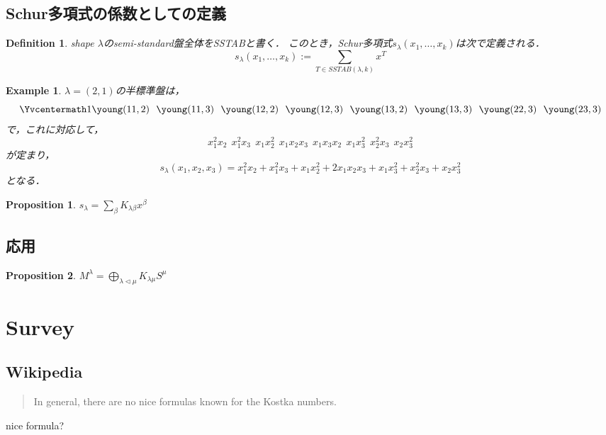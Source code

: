 \documentclass{ujarticle}[12pt,a4pepar]
\theoremstyle{jplain}
\newtheorem*{dfn*}{Definition}
\newtheorem*{prop*}{Proposition}
\newtheorem*{ex*}{Example}
\begin{document}
\subsection{Schur多項式の係数としての定義}
  \begin{dfn*}
    shape $\lambda$のsemi-standard盤全体をSSTABと書く．
    このとき，Schur多項式$s_{\lambda}(x_1, \dots, x_k)$は次で定義される．
    \[
      s_{\lambda}(x_1, \dots, x_k) := \sum_{T \in SSTAB(\lambda, k)} x^T
    \]
  \end{dfn*}
  \begin{ex*}
    $\lambda = (2,1)$の半標準盤は，
    \[
      \Yvcentermath1
      \young({11},{2})\ \ \young({11},{3})\ \ \young({12},{2})\ \ \young({12},{3})\ \
      \young({13},{2})\ \ \young({13},{3})\ \ \young({22},{3})\ \ \young({23},{3})
    \]
    で，これに対応して，
    \[
      x_1^2x_2\ \ x_1^2x_3\ \ x_1x_2^2\ \ x_1x_2x_3\ \ x_1x_3x_2\ \ x_1x_3^2\ \ x_2^2x_3\ \ x_2x_3^2
    \]
    が定まり，
    \[
      s_{\lambda}(x_1,x_2,x_3) = x_1^2x_2 + x_1^2x_3 + x_1x_2^2 + 2 x_1x_2x_3 + x_1x_3^2 + x_2^2x_3 + x_2x_3^2
    \]
    となる．
  \end{ex*}

  \begin{prop*}
    $s_{\lambda} = \sum_\beta K_{\lambda \beta} x^\beta$
  \end{prop*}

\subsection{応用}
  \begin{prop*}
    $M^{\lambda} = \bigoplus_{\lambda \triangleleft \mu} K_{\lambda \mu}S^{\mu}$
  \end{prop*}

\section{Survey}
\subsection{Wikipedia}
\begin{quote}
  In general, there are no nice formulas known for the Kostka numbers.
\end{quote}
nice formula?
\end{document}
